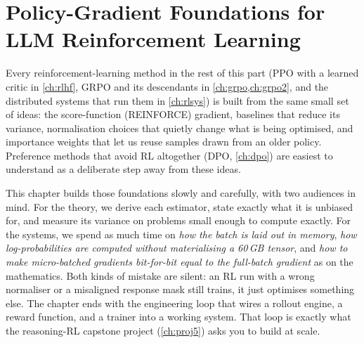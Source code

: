 \chapter{Policy-Gradient Foundations for LLM Reinforcement Learning}\label{ch:pg}

Every reinforcement-learning method in the rest of this part (PPO with a learned critic in
\cref{ch:rlhf}, GRPO and its descendants in \cref{ch:grpo,ch:grpo2}, and the
distributed systems that run them in \cref{ch:rlsys}) is built from the same small set
of ideas: the score-function (REINFORCE) gradient, baselines that reduce its variance,
normalisation choices that quietly change what is being optimised, and importance weights
that let us reuse samples drawn from an older policy. Preference methods that avoid RL
altogether (DPO, \cref{ch:dpo}) are easiest to understand as a deliberate step away from
these ideas.

This chapter builds those foundations slowly and carefully, with two audiences in mind.
For the theory, we derive each estimator, state exactly what it is unbiased for, and
measure its variance on problems small enough to compute exactly. For the systems, we
spend as much time on \emph{how the batch is laid out in memory}, \emph{how log-probabilities
are computed without materialising a 60\,GB tensor}, and \emph{how to make micro-batched
gradients bit-for-bit equal to the full-batch gradient} as on the mathematics. Both kinds of
mistake are silent: an RL run with a wrong normaliser or a misaligned response mask still
trains, it just optimises something else. The chapter ends with the engineering loop that
wires a rollout engine, a reward function, and a trainer into a working system. That loop
is exactly what the reasoning-RL capstone project (\cref{ch:proj5}) asks you to build at
scale.

